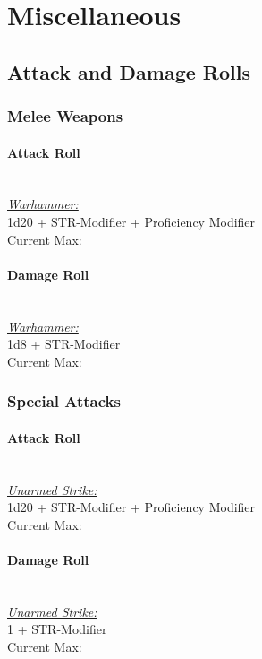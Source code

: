 {\vfill\eject
\section*{Miscellaneous}
\subsection*{Attack and Damage Rolls}
\subsubsection*{Melee Weapons}
\paragraph*{Attack Roll}\hfill\\
\underline{\textit{Warhammer:}}\\
1d20 + STR-Modifier + Proficiency Modifier\\
\indent Current Max: 
\paragraph*{Damage Roll}\hfill\\
\underline{\textit{Warhammer:}}\\
1d8 + STR-Modifier\\
\indent Current Max: 
\subsubsection*{Special Attacks}
\paragraph*{Attack Roll}\hfill\\
\underline{\textit{Unarmed Strike:}}\\
1d20 + STR-Modifier + Proficiency Modifier\\
\indent Current Max: 
\paragraph*{Damage Roll}\hfill\\
\underline{\textit{Unarmed Strike:}}\\
1 + STR-Modifier\\
\indent Current Max: 

}
